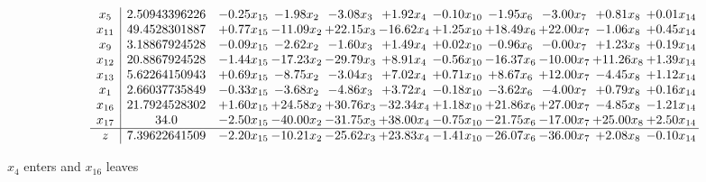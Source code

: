 \documentclass[9pt]{article}
\begin{document}
 \[\begin{array}{c| c c@{\hskip 2pt} c@{\hskip 2pt} c@{\hskip 2pt} c@{\hskip 2pt} c@{\hskip 2pt} c@{\hskip 2pt} c@{\hskip 2pt} c@{\hskip 2pt} c@{\hskip 2pt} }
 x_{5}   &  2.50943396226 & -0.25 x_{15} & -1.98 x_{2} & -3.08 x_{3} & +  1.92 x_{4} & -0.10 x_{10} & -1.95 x_{6} & -3.00 x_{7} & +  0.81 x_{8} & +  0.01 x_{14}\\
 x_{11}   &  49.4528301887 & +  0.77 x_{15} & -11.09 x_{2} & + 22.15 x_{3} & -16.62 x_{4} & +  1.25 x_{10} & + 18.49 x_{6} & + 22.00 x_{7} & -1.06 x_{8} & +  0.45 x_{14}\\
 x_{9}   &  3.18867924528 & -0.09 x_{15} & -2.62 x_{2} & -1.60 x_{3} & +  1.49 x_{4} & +  0.02 x_{10} & -0.96 x_{6} & -0.00 x_{7} & +  1.23 x_{8} & +  0.19 x_{14}\\
 x_{12}   &  20.8867924528 & -1.44 x_{15} & -17.23 x_{2} & -29.79 x_{3} & +  8.91 x_{4} & -0.56 x_{10} & -16.37 x_{6} & -10.00 x_{7} & + 11.26 x_{8} & +  1.39 x_{14}\\
 x_{13}   &  5.62264150943 & +  0.69 x_{15} & -8.75 x_{2} & -3.04 x_{3} & +  7.02 x_{4} & +  0.71 x_{10} & +  8.67 x_{6} & + 12.00 x_{7} & -4.45 x_{8} & +  1.12 x_{14}\\
 x_{1}   &  2.66037735849 & -0.33 x_{15} & -3.68 x_{2} & -4.86 x_{3} & +  3.72 x_{4} & -0.18 x_{10} & -3.62 x_{6} & -4.00 x_{7} & +  0.79 x_{8} & +  0.16 x_{14}\\
 x_{16}   &  21.7924528302 & +  1.60 x_{15} & + 24.58 x_{2} & + 30.76 x_{3} & -32.34 x_{4} & +  1.18 x_{10} & + 21.86 x_{6} & + 27.00 x_{7} & -4.85 x_{8} & -1.21 x_{14}\\
 x_{17}   &  34.0 & -2.50 x_{15} & -40.00 x_{2} & -31.75 x_{3} & + 38.00 x_{4} & -0.75 x_{10} & -21.75 x_{6} & -17.00 x_{7} & + 25.00 x_{8} & +  2.50 x_{14}\\
\hline
z    &  7.39622641509 & -2.20 x_{15} & -10.21 x_{2} & -25.62 x_{3} & + 23.83 x_{4} & -1.41 x_{10} & -26.07 x_{6} & -36.00 x_{7} & +  2.08 x_{8} & -0.10 x_{14}\\
\end{array}\]


 $ x_{4} $ enters and $ x_{16} $ leaves 
\end{document}
